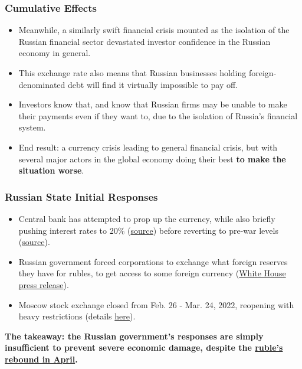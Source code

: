 \documentclass[handout]{beamer}
\begin{document}
\begin{frame} 
	\frametitle{\LARGE{Cumulative Effects}}
	\begin{itemize}
		\item Meanwhile, a similarly swift financial crisis mounted as the isolation of the Russian financial sector devastated investor confidence in the Russian economy in general. \pause
		\item This exchange rate also means that Russian businesses holding foreign-denominated debt will find it virtually impossible to pay off. \pause
		\item Investors know that, and know that Russian firms may be unable to make their payments even if they want to, due to the isolation of Russia's financial system. \pause
		\item End result: a currency crisis leading to general financial crisis, but with several major actors in the global economy doing their best \textbf{to make the situation worse}.
	\end{itemize}
\end{frame}

\begin{frame} 
	\frametitle{\LARGE{Russian State Initial Responses}}
	\begin{itemize}
		\item Central bank has attempted to prop up the currency, while also briefly pushing interest rates to 20\% (\href{https://www.npr.org/2022/02/28/1083478065/russias-central-bank-doubles-a-key-interest-rate-as-sanctions-spark-economic-tur}{source}) before reverting to pre-war levels (\href{https://www.cnbc.com/2022/06/10/russia-cuts-key-interest-rate-back-to-pre-war-level.html}{source}). \pause
		\item Russian government forced corporations to exchange what foreign reserves they have for rubles, to get access to some foreign currency (\href{https://www.whitehouse.gov/briefing-room/statements-releases/2022/03/24/fact-sheet-united-states-and-allies-and-partners-impose-additional-costs-on-russia/}{White House press release}). \pause
		\item Moscow stock exchange closed from Feb. 26 - Mar. 24, 2022, reopening with heavy restrictions (details \href{https://fortune.com/2022/03/24/russia-stock-market-reopen-moex-month-offline/}{here}). \pause
	\end{itemize}
	\textbf{The takeaway: the Russian government's responses are simply insufficient to prevent severe economic damage, despite the \href{https://www.nytimes.com/2022/04/04/opinion/ruble-value.html}{ruble's rebound in April}.}
\end{frame}
\end{document}
